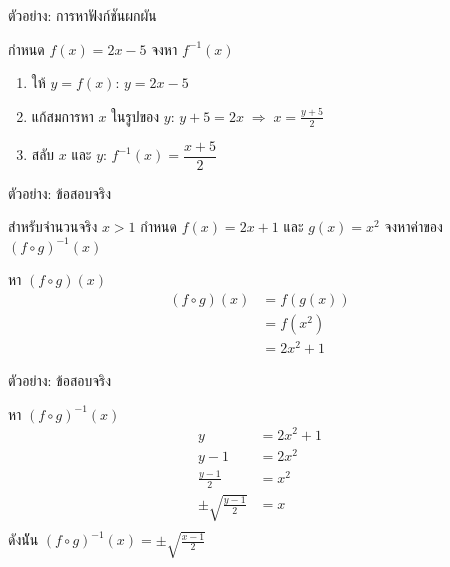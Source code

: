\documentclass[11pt, aspectratio=169]{beamer}
\begin{document}
\begin{frame}{ตัวอย่าง: การหาฟังก์ชันผกผัน}
  \begin{exambox}[โจทย์]
    กำหนด $f(x) = 2x - 5$ จงหา $f^{-1}(x)$
  \end{exambox}

  \begin{solbox}[วิธีทำ]
    \begin{enumerate}
      \item ให้ $y = f(x)$: \quad $y = 2x - 5$
      \item แก้สมการหา $x$ ในรูปของ $y$:
        \quad $y + 5 = 2x \;\Rightarrow\; x = \frac{y + 5}{2}$
      \item สลับ $x$ และ $y$: \quad $f^{-1}(x) = \dfrac{x + 5}{2}$
    \end{enumerate}
  \end{solbox}
\end{frame}

\begin{frame}{ตัวอย่าง: ข้อสอบจริง}
  \begin{exambox}[โจทย์ปี 67 ข้อ 5]
    สำหรับจำนวนจริง $x>1$ กำหนด $f(x)=2x+1$ และ $g(x)=x^2$ จงหาค่าของ $(f\circ g)^{-1}(x)$
  \end{exambox}

  \begin{solbox}[วิธีทำ]
    หา $(f\circ g)(x)$
    \begin{align*}
        (f\circ g)(x) &= f(g(x)) \\
        &= f(x^2) \\
        &= 2x^2+1 
    \end{align*}
  \end{solbox}
\end{frame}

\begin{frame}{ตัวอย่าง: ข้อสอบจริง}
  \begin{solbox}[วิธีทำ (ต่อ)]
    หา $(f\circ g)^{-1}(x)$
    \begin{align*}
        y &= 2x^2+1 \\
        y-1 &= 2x^2 \\
        \frac{y-1}{2} &= x^2 \\
        \pm \sqrt{\frac{y-1}{2}} &= x \\ 
    \end{align*}
    ดังนััน $(f\circ g)^{-1}(x) = \pm \sqrt{\frac{x-1}{2}}$
  \end{solbox}
\end{frame}

\end{document}
